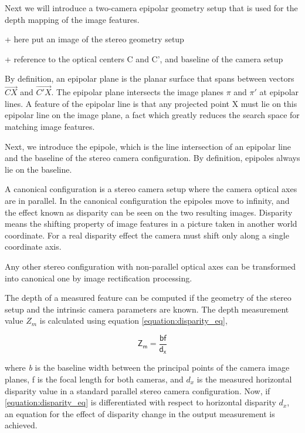\documentclass[12pt,a4paper,oneside,pdftex]{report}
\begin{document}
{Next we will introduce a two-camera epipolar geometry setup that is used for the depth mapping of the image features.

+ here put an image of the stereo geometry setup

+ reference to the optical centers C and C', and baseline of the camera setup

By definition, an epipolar plane is the planar surface that spans between vectors $\vec{CX}$ and $\vec{C'X}$. The epipolar plane intersects the image planes $\pi$ and $\pi'$ at epipolar lines. A feature of the epipolar line is that any projected point X must lie on this epipolar line on the image plane, a fact which greatly reduces the search space for matching image features.

Next, we introduce the epipole, which is the line intersection of an epipolar line and the baseline of the stereo camera configuration. By definition, epipoles always lie on the baseline.

A canonical configuration is a stereo camera setup where the camera optical axes are in parallel. In the canonical configuration the epipoles move to infinity, and the effect known as disparity can be seen on the two resulting images. Disparity means the shifting property of image features in a picture taken in another world coordinate. For a real disparity effect the camera must shift only along a single coordinate axis.

Any other stereo configuration with non-parallel optical axes can be transformed into canonical one by image rectification processing. 

The depth of a measured feature can be computed if the geometry of the stereo setup and the intrinsic camera parameters are known. The depth measurement value $Z_m$ is calculated using equation \ref{equation:disparity_eq},

\begin{equation}
\label{equation:disparity_eq}
\mathsf{Z_m} = \frac{\mathsf{bf}}{\mathsf{d_x}}
\end{equation}

where \emph{b} is the baseline width between the principal points of the camera image planes, f is the focal length for both cameras, and $d_x$ is the measured horizontal disparity value in a standard parallel stereo camera configuration. Now, if \ref{equation:disparity_eq} is differentiated with respect to horizontal disparity $d_x$, an equation for the effect of disparity change in the output measurement is achieved. 

}
\end{document}
